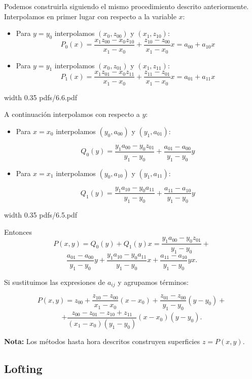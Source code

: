 \documentclass[twoside]{report}
\newcommand{\colocapdf}[2]{\quad\pdfimage width #2 {pdfs/#1.pdf}}
\begin{document}
Podemos construirla siguiendo el mismo procedimiento descrito anteriormente. Interpolamos en primer lugar con respecto a la variable $x$:
\begin{itemize}
\item Para $y=y_0$ interpolamos $(x_0,z_{00})$ y $(x_1,z_{10})$:
$$P_0(x)=\frac{x_1 z_{00}-x_0 z_{10}}{x_1-x_0}+\frac{z_{10}-z_{00}}{x_1-x_0}x=a_{00}+a_{10}x$$
\item Para $y=y_1$ interpolamos $(x_0,z_{01})$ y $(x_1,z_{11})$:
$$P_1(x)=\frac{x_1 z_{01}-x_0 z_{11}}{x_1-x_0}+\frac{z_{11}-z_{01}}{x_1-x_0}x=a_{01}+a_{11}x$$
\end{itemize}

\begin{center}
\colocapdf{6.6}{0.35\textwidth}
\end{center}

A continuación interpolamos con respecto a $y$:
\begin{itemize}
\item Para $x=x_0$ interpolamos $(y_0,a_{00})$ y $(y_1,a_{01})$:

$$Q_0(y)=\frac{y_1 a_{00}-y_0 z_{01}}{y_1-y_0}+\frac{a_{01}-a_{00}}{y_1-y_0}y$$
\item Para $x=x_1$ interpolamos $(y_0,a_{10})$ y $(y_1,a_{11})$:

$$Q_1(y)=\frac{y_1 a_{10}-y_0 a_{11}}{y_1-y_0}+\frac{a_{11}-a_{10}}{y_1-y_0}y$$

\end{itemize}

\begin{center}
\colocapdf{6.5}{0.35\textwidth}
\end{center}

Entonces
$$P(x,y)=Q_0(y)+Q_1(y)x=\frac{y_1 a_{00}-y_0 z_{01}}{y_1-y_0}+$$
$$\frac{a_{01}-a_{00}}{y_1-y_0}y+\frac{y_1 a_{10}-y_0 a_{11}}{y_1-y_0}x+\frac{a_{11}-a_{10}}{y_1-y_0}yx.$$

Si sustituimos las expresiones de $a_{ij}$ y agrupamos términos:

$$P(x,y)=z_{00}+\frac{z_{10}- z_{00}}{x_1-x_0}(x-x_0)+\frac{z_{01}-z_{00}}{y_1-y_0}(y-y_0)+$$
$$+\frac{z_{00}-z_{01}-z_{10}+z_{11}}{(x_1-x_0)(y_1-y_0)}(x-x_0)(y-y_0).$$

{\bf Nota:} Los métodos hasta hora descritos construyen superficies $z=P(x,y).$

\subsection{Lofting}
\end{document}
